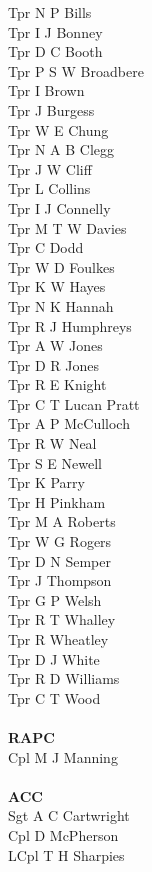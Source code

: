 \begin{multicols}{4}
  Tpr N P Bills \\
  Tpr I J Bonney \\
  Tpr D C Booth \\
  Tpr P S W Broadbere \\
  Tpr I Brown \\
  Tpr J Burgess \\
  Tpr W E Chung \\
  Tpr N A B Clegg \\
  Tpr J W Cliff \\
  Tpr L Collins \\
  Tpr I J Connelly \\
  Tpr M T W Davies \\
  Tpr C Dodd \\
  Tpr W D Foulkes \\
  Tpr K W Hayes \\
  Tpr N K Hannah \\
  Tpr R J Humphreys \\
  Tpr A W Jones \\
  Tpr D R Jones \\
  Tpr R E Knight \\
  Tpr C T Lucan Pratt \\
  Tpr A P McCulloch \\
  Tpr R W Neal \\
  Tpr S E Newell \\
  Tpr K Parry \\
  Tpr H Pinkham \\
  Tpr M A Roberts \\
  Tpr W G Rogers \\
  Tpr D N Semper \\
  Tpr J Thompson \\
  Tpr G P Welsh \\
  Tpr R T Whalley \\
  Tpr R Wheatley \\
  Tpr D J White \\
  Tpr R D Williams \\
  Tpr C T Wood \\
  \\
  \textbf{RAPC} \\
  Cpl M J Manning \\
  \\
  \textbf{ACC} \\
  Sgt A C Cartwright \\
  Cpl D McPherson \\
  LCpl T H Sharpies \\

\end{multicols}
